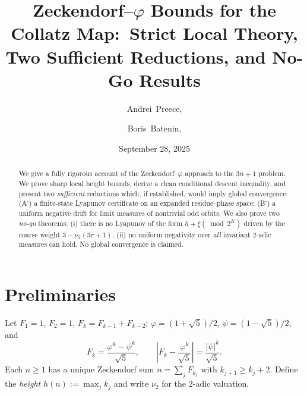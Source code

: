 \documentclass[reprint,aps,prd,showpacs,amsmath,amssymb,floatfix]{revtex4-2}
\begin{document}
 
\title{Zeckendorf–$\varphi$ Bounds for the Collatz Map:\ Strict Local Theory, Two Sufficient Reductions, and No-Go Results}
\author{Andrei~Preece,}  
\author{Boris~Batenin,}  
\date{September 28, 2025}
\begin{abstract} We give a fully rigorous account of the Zeckendorf–$\varphi$ approach to the $3n{+}1$ problem. We prove sharp local height bounds, derive a clean conditional descent inequality, and present two \emph{sufficient} reductions which, if established, would imply global convergence: (A$’$) a finite-state Lyapunov certificate on an expanded residue–phase space; (B$’$) a uniform negative drift for limit measures of nontrivial odd orbits. We also prove two \emph{no-go} theorems: (i) there is no Lyapunov of the form $h+\xi(\bmod 2^K)$ driven by the coarse weight $3-\nu_2(3r{+}1)$; (ii) no uniform negativity over \emph{all} invariant $2$-adic measures can hold. No global convergence is claimed. \end{abstract}
\maketitle
\section{Preliminaries}
Let $F_1=1$, $F_2=1$, $F_k=F_{k-1}+F_{k-2}$; $\varphi=(1+\sqrt5)/2$, $\psi=(1-\sqrt5)/2$, and \begin{equation}\label{eq:binet} F_k=\frac{\varphi^k-\psi^k}{\sqrt5},\qquad \left|F_k-\frac{\varphi^k}{\sqrt5}\right|=\frac{|\psi|^k}{\sqrt5}. \end{equation} Each $n\ge1$ has a unique Zeckendorf sum $n=\sum_j F_{k_j}$ with $k_{j+1}\ge k_j+2$. Define the \emph{height} $h(n):=\max_j k_j$ and write $\nu_2$ for the $2$-adic valuation.
\end{document}
